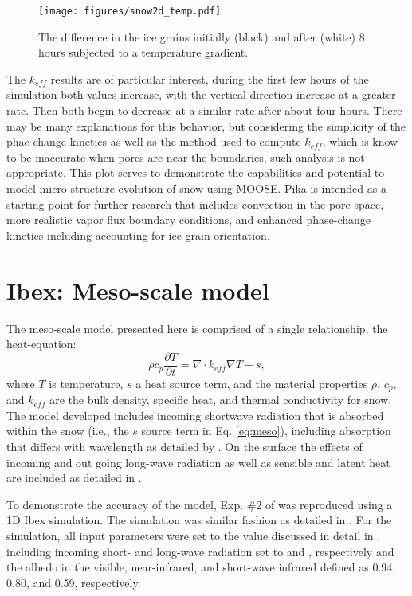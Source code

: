 \begin{figure}[!ht]
  \texttt{[image: figures/snow2d\_temp.pdf]}
  \caption{The difference in the ice grains initially (black) and after (white) 8 hours subjected to a  temperature gradient.}
  \label{fig:snow2d:grains}
\end{figure}

The $k_{eff}$ results are of particular interest, during the first few hours of the simulation both values increase, with the vertical direction increase at a greater rate. Then both begin to decrease at a similar rate after about four hours. There may be many explanations for this behavior, but considering the simplicity of the phae-change kinetics as well as the method used to compute $k_{eff}$, which is know to be inaccurate when pores are near the boundaries, such analysis is not appropriate. This plot serves to demonstrate the capabilities and potential to model micro-structure evolution of snow using MOOSE. Pika is intended as a starting point for further research that includes convection in the pore space, more realistic vapor flux boundary conditions, and enhanced phase-change kinetics including accounting for ice grain orientation.


\section{Ibex: Meso-scale model}\label{sec:ibex}
The meso-scale model presented here is comprised of a single relationship, the heat-equation:
\begin{equation}\label{eq:meso}
\rho c_p \frac{\partial{T}}{\partial t} = \nabla \cdot k_{eff} \nabla T + s,
\end{equation}
where $T$ is temperature, $s$ a heat source term, and the material properties $\rho$, $c_p$, and $k_{eff}$ are the bulk density, specific heat, and thermal conductivity for snow. The model developed includes incoming shortwave radiation that is absorbed within the snow (i.e., the $s$ source term in Eq. \eqref{eq:meso}), including absorption that differs with wavelength as detailed by \citet[][Ch. 4]{slaughter2010numerical}. On the surface the effects of incoming and out going long-wave radiation as well as sensible and latent heat are included as detailed in \citet{slaughter2010numerical}.

To demonstrate the accuracy of the model, Exp. \#2 of \citet{morstad2007experimental} was reproduced using a 1D Ibex simulation. The simulation was similar fashion as detailed in \citet[][Ch. 4]{slaughter2010numerical}. For the simulation, all input parameters were set to the value discussed in detail in \citet{slaughter2010numerical}, including incoming short- and long-wave radiation set to  and , respectively and the albedo in the visible, near-infrared, and short-wave infrared defined as 0.94, 0.80, and 0.59, respectively.

